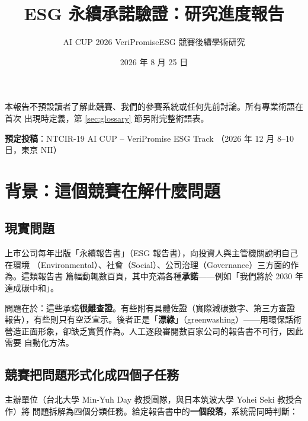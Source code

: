 \documentclass[11pt,a4paper]{ctexart}
\title{\textbf{ESG 永續承諾驗證：研究進度報告}}
\author{AI CUP 2026 VeriPromiseESG 競賽後續學術研究}
\date{2026 年 8 月 25 日}
\begin{document}

\maketitle

\begin{tcolorbox}[colback=gray!8, colframe=gray!50, title=給初次閱讀者]
本報告不預設讀者了解此競賽、我們的參賽系統或任何先前討論。所有專業術語在首次
出現時定義，第 \ref{sec:glossary} 節另附完整術語表。
\end{tcolorbox}

\vspace{0.5em}
\noindent\textbf{預定投稿}：NTCIR-19 AI CUP -- VeriPromise ESG Track
（2026 年 12 月 8--10 日，東京 NII）

\tableofcontents
\newpage

\section{背景：這個競賽在解什麼問題}

\subsection{現實問題}

上市公司每年出版「永續報告書」（ESG 報告書），向投資人與主管機關說明自己在環境
（Environmental）、社會（Social）、公司治理（Governance）三方面的作為。這類報告書
篇幅動輒數百頁，其中充滿各種\textbf{承諾}——例如「我們將於 2030 年達成碳中和」。

問題在於：這些承諾\textbf{很難查證}。有些附有具體佐證（實際減碳數字、第三方查證
報告），有些則只有空泛宣示。後者正是「\textbf{漂綠}」（greenwashing）——用環保話術
營造正面形象，卻缺乏實質作為。人工逐段審閱數百家公司的報告書不可行，因此需要
自動化方法。

\subsection{競賽把問題形式化成四個子任務}

主辦單位（台北大學 Min-Yuh Day 教授團隊，與日本筑波大學 Yohei Seki 教授合作）將
問題拆解為四個分類任務。給定報告書中的\textbf{一個段落}，系統需同時判斷：
\end{document}
